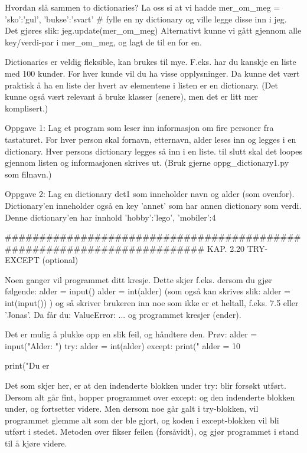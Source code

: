 {Hvordan slå sammen to dictionaries?
La oss si at vi hadde 
mer_om_meg = {'sko':'gul', 'bukse':'svart'}   # fylle en ny dictionary
og ville legge disse inn i jeg.
Det gjøres slik:
jeg.update(mer_om_meg)
Alternativt kunne vi gått gjennom alle key/verdi-par i mer_om_meg, 
og lagt de til en for en.

Dictionaries er veldig fleksible, kan brukes til mye.
F.eks. har du kanskje en liste med 100 kunder.
For hver kunde vil du ha visse opplysninger.
Da kunne det vært praktisk å ha en liste der hvert av elementene i listen er en dictionary.
(Det kunne også vært relevant å bruke klasser (senere), men det er litt mer komplisert.) 



Oppgave 1: Lag et program som leser inn informasjon om fire personer fra tastaturet.
For hver person skal fornavn, etternavn, alder leses inn og legges i en dictionary.
Hver persons dictionary legges så inn i en liste.
til slutt skal det loopes gjennom listen og informasjonen skrives ut. 
(Bruk gjerne oppg_dictionary1.py som filnavn.) 


Oppgave 2: Lag en dictionary dct1 som inneholder navn og alder (som ovenfor).
Dictionary'en inneholder også en key 'annet' som har annen dictionary som verdi.
Denne dictionary'en har innhold {'hobby':'lego', 'mobiler':4}

######################################################################## 
KAP. 2.20  TRY-EXCEPT (optional)

Noen ganger vil programmet ditt kresje.
Dette skjer f.eks. dersom du gjør følgende:
alder = input()
alder = int(alder)
(som også kan skrives slik: alder = int(input()) )
og så skriver brukeren inn noe som ikke er et heltall, f.eks. 7.5 eller 'Jonas'.
Da får du:
ValueError: ...
og programmet kresjer (ender). 

Det er mulig å plukke opp en slik feil, og håndtere den. 
Prøv: 
alder = input("Alder: ")
try:
    alder = int(alder)
except:
    print("%
    alder = 10 

print("Du er %
    
Det som skjer her, er at den indenderte blokken under try: blir forsøkt utført.
Dersom alt går fint, hopper programmet over except: og den indenderte blokken under, 
og fortsetter videre. 
Men dersom noe går galt i try-blokken, vil programmet glemme alt som der ble gjort, 
og koden i except-blokken vil bli utført i stedet. 
Metoden over fikser feilen (forsåvidt), og gjør programmet i stand til å kjøre videre. 

}
